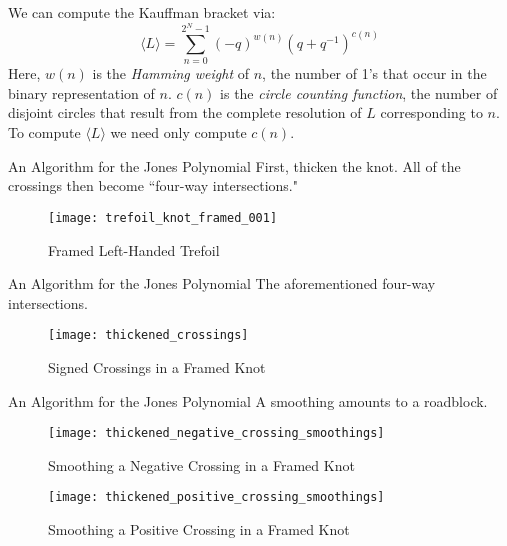 \documentclass{beamer}
\begin{document}
    \begin{frame}
        We can compute the Kauffman bracket via:
        \begin{equation}
            \label{eqn:kauffman_bracket}%
            \langle{L}\rangle=\sum_{n=0}^{2^{N}-1}
                (-q)^{w(n)}(q+q^{-1})^{c(n)}
        \end{equation}
        Here, $w(n)$ is the \textit{Hamming weight} of $n$, the number of 1's
        that occur in the binary representation of $n$. $c(n)$ is the
        \textit{circle counting function}, the number of disjoint circles that
        result from the complete resolution of $L$ corresponding to $n$.
        To compute $\langle{L}\rangle$ we need only compute $c(n)$.
    \end{frame}
    \begin{frame}{An Algorithm for the Jones Polynomial}
        First, thicken the knot. All of the crossings then become
        ``four-way intersections."
        \begin{figure}
            \centering
            \texttt{[image: trefoil\_knot\_framed\_001]}
            \caption{Framed Left-Handed Trefoil}
            \label{fig:trefoil_knot_framed_001}
        \end{figure}
    \end{frame}
    \begin{frame}{An Algorithm for the Jones Polynomial}
        The aforementioned four-way intersections.
        \begin{figure}
            \centering
            \texttt{[image: thickened\_crossings]}
            \caption{Signed Crossings in a Framed Knot}
            \label{fig:thickened_crossings}
        \end{figure}
    \end{frame}
    \begin{frame}{An Algorithm for the Jones Polynomial}
        A smoothing amounts to a roadblock.
        \begin{figure}
            \centering
            \texttt{[image: thickened\_negative\_crossing\_smoothings]}
            \caption{Smoothing a Negative Crossing in a Framed Knot}
            \label{fig:thickened_negative_crossing_smoothings}
        \end{figure}
        \begin{figure}
            \centering
            \texttt{[image: thickened\_positive\_crossing\_smoothings]}
            \caption{Smoothing a Positive Crossing in a Framed Knot}
            \label{fig:thickened_positive_crossing_smoothings}
        \end{figure}
    \end{frame}
\end{document}

